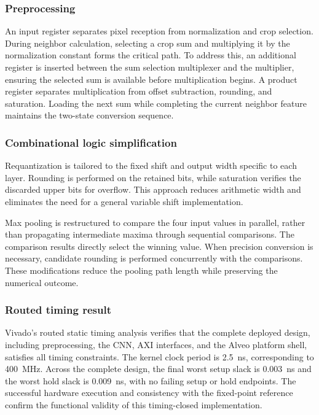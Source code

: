 \subsubsection{Preprocessing}

An input register separates pixel reception from normalization and crop selection. During neighbor calculation, selecting a crop sum and multiplying it by the normalization constant forms the critical path. To address this, an additional register is inserted between the sum selection multiplexer and the multiplier, ensuring the selected sum is available before multiplication begins. A product register separates multiplication from offset subtraction, rounding, and saturation. Loading the next sum while completing the current neighbor feature maintains the two-state conversion sequence.

\subsubsection{Combinational logic simplification}

Requantization is tailored to the fixed shift and output width specific to each layer. Rounding is performed on the retained bits, while saturation verifies the discarded upper bits for overflow. This approach reduces arithmetic width and eliminates the need for a general variable shift implementation.

Max pooling is restructured to compare the four input values in parallel, rather than propagating intermediate maxima through sequential comparisons. The comparison results directly select the winning value. When precision conversion is necessary, candidate rounding is performed concurrently with the comparisons. These modifications reduce the pooling path length while preserving the numerical outcome.

\subsubsection{Routed timing result}

Vivado's routed static timing analysis verifies that the complete deployed design, including preprocessing, the CNN, AXI interfaces, and the Alveo platform shell, satisfies all timing constraints. The kernel clock period is \SI{2.5}{\nano\second}, corresponding to \SI{400}{\mega\hertz}. Across the complete design, the final worst setup slack is \SI{+0.003}{\nano\second} and the worst hold slack is \SI{+0.009}{\nano\second}, with no failing setup or hold endpoints. The successful hardware execution and consistency with the fixed-point reference confirm the functional validity of this timing-closed implementation.
